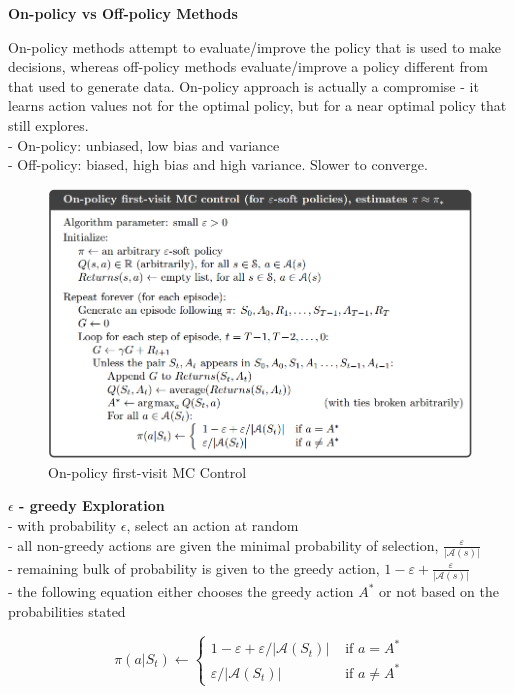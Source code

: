 \documentclass{article}
\begin{document}
\newpage
\noindent
\textbf{On-policy vs Off-policy Methods}

\noindent
On-policy methods attempt to evaluate/improve the policy that is used to make
decisions, whereas off-policy methods evaluate/improve a policy different from
that used to generate data. On-policy approach is actually a compromise - it
learns action values not for the optimal policy, but for a near optimal policy
that still explores.\\
- On-policy: unbiased, low bias and variance\\
- Off-policy: biased, high bias and high variance. Slower to converge.\\

\begin{figure}[h]
\includegraphics[scale=0.4]{onpolicy_firstvisit_mc}
\centering
\caption{On-policy first-visit MC Control}
\end{figure}

\noindent
\textbf{$\epsilon$ - greedy Exploration}\\
- with probability $\epsilon$, select an action at random\\
- all non-greedy actions are given the minimal probability of selection, $\frac{\varepsilon}{|\mathcal{A}(s)|}$\\
- remaining bulk of probability is given to the greedy action,
$1-\varepsilon+\frac{\varepsilon}{|\mathcal{A}(s)|}$ \\
- the following equation either chooses the greedy action $A^{*}$ or not based on
the probabilities stated

\begin{equation}
\pi\left(a | S_{t}\right) \leftarrow\left\{\begin{array}{ll}
1-\varepsilon+\varepsilon /\left|\mathcal{A}\left(S_{t}\right)\right| & \text { if } a=A^{*} \\
\varepsilon /\left|\mathcal{A}\left(S_{t}\right)\right| & \text { if } a \neq A^{*}
\end{array}\right.
\end{equation}
\end{document}
